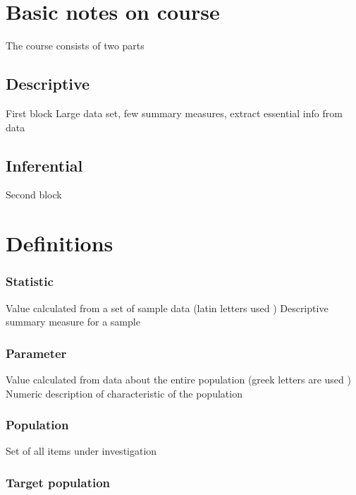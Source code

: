 \documentclass[]{article}
\date{}
\begin{document}
\hypertarget{basic-notes-on-course}{%
\section{Basic notes on course}\label{basic-notes-on-course}}

The course consists of two parts

\hypertarget{descriptive}{%
\subsection{Descriptive}\label{descriptive}}

First block Large data set, few summary measures, extract essential info
from data

\hypertarget{inferential}{%
\subsection{Inferential}\label{inferential}}

Second block

\hypertarget{definitions}{%
\section{Definitions}\label{definitions}}

\hypertarget{statistic}{%
\subsubsection{Statistic}\label{statistic}}

Value calculated from a set of sample data (latin letters used )
Descriptive summary measure for a sample

\hypertarget{parameter}{%
\subsubsection{Parameter}\label{parameter}}

Value calculated from data about the entire population (greek letters
are used ) Numeric description of characteristic of the population

\hypertarget{population}{%
\subsubsection{Population}\label{population}}

Set of all items under investigation

\hypertarget{target-population}{%
\subsubsection{Target population}\label{target-population}}
\end{document}
